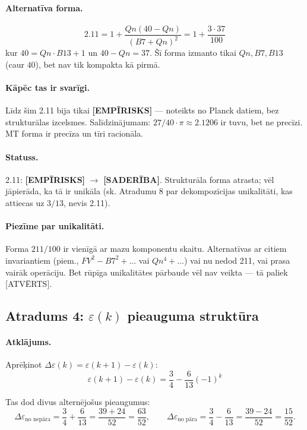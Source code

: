 \documentclass[12pt,a4paper]{article}
\begin{document}
\paragraph{Alternatīva forma.}
\[
2.11 = 1 + \frac{Qn(40-Qn)}{(B7+Qn)^2} = 1 + \frac{3 \cdot 37}{100}
\]
kur $40 = Qn \cdot B13 + 1$ un $40 - Qn = 37$. Šī forma izmanto tikai $Qn, B7, B13$ (caur $40$), bet nav tik kompakta kā pirmā.

\paragraph{Kāpēc tas ir svarīgi.}
Līdz šim 2.11 bija tikai \textbf{[EMPĪRISKS]} — noteikts no Planck datiem, bez strukturālas izcelsmes. Salīdzinājumam: $27/40 \cdot \pi \approx 2.1206$ ir tuvu, bet ne precīzi. MT forma ir precīza un tīri racionāla.

\paragraph{Statuss.}
2.11: \textbf{[EMPĪRISKS]} $\to$ \textbf{[SADERĪBA]}. Strukturāla forma atrasta; vēl jāpierāda, ka tā ir unikāla (sk. Atradumu 8 par dekompozīcijas unikalitāti, kas attiecas uz $3/13$, nevis 2.11).

\paragraph{Piezīme par unikalitāti.}
Forma $211/100$ ir vienīgā ar mazu komponentu skaitu. Alternatīvas ar citiem invariantiem (piem., $FV^2 - B7^2 + ...$ vai $Qn^4 + ...$) vai nu nedod 211, vai prasa vairāk operāciju. Bet rūpīga unikalitātes pārbaude vēl nav veikta — tā paliek [ATVĒRTS].

\subsection*{Atradums 4: $\varepsilon(k)$ pieauguma struktūra}

\paragraph{Atklājums.}
Aprēķinot $\Delta\varepsilon(k) = \varepsilon(k+1) - \varepsilon(k)$:
\[
\varepsilon(k+1) - \varepsilon(k) = \frac{3}{4} - \frac{6}{13}(-1)^k
\]

Tas dod divus alternējošus pieaugumus:
\[
\Delta\varepsilon_{\text{no nepāra}} = \frac{3}{4} + \frac{6}{13} = \frac{39+24}{52} = \frac{63}{52}, \qquad
\Delta\varepsilon_{\text{no pāra}} = \frac{3}{4} - \frac{6}{13} = \frac{39-24}{52} = \frac{15}{52}.
\]
\end{document}
